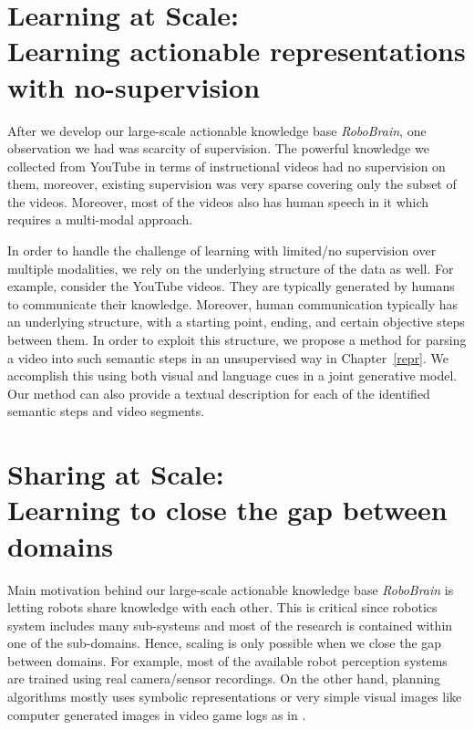 \section{Learning at Scale: \\ Learning actionable representations with no-supervision}
After we develop our large-scale actionable knowledge base \emph{RoboBrain}, one observation we had was scarcity of supervision. The powerful knowledge we collected from YouTube in terms of instructional videos had no supervision on them, moreover, existing supervision was very sparse covering only the subset of the videos. Moreover, most of the videos also has human speech in it which requires a multi-modal approach.

In order to handle the challenge of learning with limited/no supervision over multiple modalities, we rely on the underlying structure of the data as well. For example, consider the YouTube videos. They are typically generated by humans to communicate their knowledge. Moreover, human communication typically has an underlying structure, with a starting point, ending, and certain objective steps between them. In order to exploit this structure, we propose a method for parsing a video into such semantic steps in an unsupervised way in Chapter~\ref{repr}. We accomplish this using both visual and language cues in a joint generative model. Our method can also provide a textual description for each of the identified semantic steps and video segments. 

\section{Sharing at Scale: \\ Learning to close the gap between domains}
Main motivation behind our large-scale actionable knowledge base \emph{RoboBrain} is letting robots share knowledge with each other. This is critical since robotics system includes many sub-systems and most of the research is contained within one of the sub-domains. Hence, scaling is only possible when we close the gap between domains. For example, most of the available robot perception systems are trained using real camera/sensor recordings. On the other hand, planning algorithms mostly uses symbolic representations or very simple visual images like computer generated images in video game logs as in \cite{misra2014tell}.

